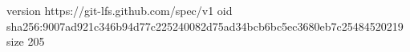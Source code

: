 version https://git-lfs.github.com/spec/v1
oid sha256:9007ad921c346b94d77c225240082d75ad34bcb6bc5ec3680eb7c25484520219
size 205
